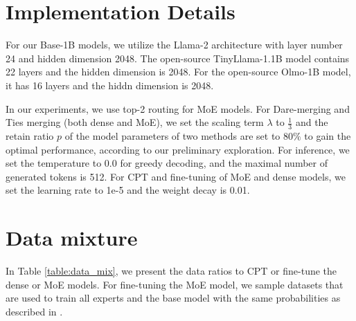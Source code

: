 \section{Implementation Details}
\label{sec:implement}
For our Base-1B models, we utilize the Llama-2 architecture \cite{wu2024llama} with layer number 24 and hidden dimension 2048. The open-source TinyLlama-1.1B model contains 22 layers and the hidden dimension is 2048. For the open-source Olmo-1B model, it has 16 layers and the hiddn dimension is 2048.

In our experiments, we use top-2 routing for MoE models. For Dare-merging and Ties merging (both dense and MoE), we set the scaling term $\lambda$ to $\frac{1}{3}$ and the retain ratio $p$ of the model parameters of two methods are set to $80\%$ to gain the optimal performance, according to our preliminary exploration. For inference, we set the temperature to 0.0 for greedy decoding, and the maximal number of generated tokens is 512. For CPT and fine-tuning of MoE and dense models, we set the learning rate to 1e-5 and the weight decay is 0.01.

\section{Data mixture}
\label{sec:data_mix}

In Table \ref{table:data_mix}, we present the data ratios to CPT or fine-tune the dense or MoE models.
For fine-tuning the MoE model, we sample datasets that are used to train all experts and the base model with the same probabilities as described in \citet{sukhbaatar2024branchtrainmixmixingexpertllms}.

